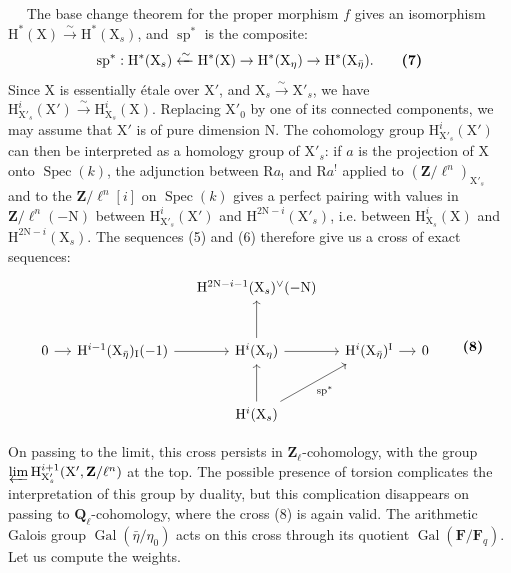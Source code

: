 \documentclass[11pt,leqno]{article}
\newcommand{\Page}[1]{\ifvmode\noindent\else\unskip\ \fi{\footnotesize\textcolor{gray}{[p.\,#1]}}\ \ignorespaces}
\begin{document}
\Page{214}
The base change theorem for the proper morphism \(f\) gives an isomorphism \(\mathrm H^*(\mathrm X)\xrightarrow{\sim}\mathrm H^*(\mathrm X_s)\), and \(\operatorname{sp}^*\) is the composite:
\[
\operatorname{sp}^*:\mathrm H^*(\mathrm X_s)
\xleftarrow{\sim}\mathrm H^*(\mathrm X)
\to\mathrm H^*(\mathrm X_\eta)
\to\mathrm H^*(\mathrm X_{\bar\eta}).
\tag*{\textbf{(7)}}
\]
Since \(\mathrm X\) is essentially étale over \(\mathrm X'\), and \(\mathrm X_s\xrightarrow{\sim}\mathrm X'_s\), we have \(\mathrm H^i_{\mathrm X'_s}(\mathrm X')\xrightarrow{\sim}\mathrm H^i_{\mathrm X_s}(\mathrm X)\). Replacing \(\mathrm X'_0\) by one of its connected components, we may assume that \(\mathrm X'\) is of pure dimension \(\mathrm N\). The cohomology group \(\mathrm H^i_{\mathrm X'_s}(\mathrm X')\) can then be interpreted as a homology group of \(\mathrm X'_s\): if \(a\) is the projection of \(\mathrm X\) onto \(\operatorname{Spec}(k)\), the adjunction between \(\mathrm R a_!\) and \(\mathrm R a^!\) applied to \((\mathbf Z/\ell^n)_{\mathrm X'_s}\) and to the \(\mathbf Z/\ell^n[i]\) on \(\operatorname{Spec}(k)\) gives a perfect pairing with values in \(\mathbf Z/\ell^n(-\mathrm N)\) between \(\mathrm H^i_{\mathrm X'_s}(\mathrm X')\) and \(\mathrm H^{2\mathrm N-i}(\mathrm X'_s)\), i.e. between \(\mathrm H^i_{\mathrm X_s}(\mathrm X)\) and \(\mathrm H^{2\mathrm N-i}(\mathrm X_s)\). The sequences (5) and (6) therefore give us a cross of exact sequences:
\[
\begin{tikzcd}[column sep=small,row sep=large]
& & \mathrm H^{2\mathrm N-i-1}(\mathrm X_s)^{\vee}(-\mathrm N) & & \\
0 \arrow[r] &
\mathrm H^{i-1}(\mathrm X_{\bar\eta})_{\mathrm I}(-1) \arrow[r] &
\mathrm H^i(\mathrm X_\eta) \arrow[r] \arrow[u] &
\mathrm H^i(\mathrm X_{\bar\eta})^{\mathrm I} \arrow[r] & 0 \\
& & \mathrm H^i(\mathrm X_s) \arrow[u] \arrow[ur,"\operatorname{sp}^*"'] & &
\end{tikzcd}
\tag*{\textbf{(8)}}
\]

On passing to the limit, this cross persists in \(\mathbf Z_\ell\)-cohomology, with the group \(\varprojlim\mathrm H^{i+1}_{\mathrm X'_s}(\mathrm X',\mathbf Z/\ell^n)\) at the top. The possible presence of torsion complicates the interpretation of this group by duality, but this complication disappears on passing to \(\mathbf Q_\ell\)-cohomology, where the cross (8) is again valid. The arithmetic Galois group \(\operatorname{Gal}(\bar\eta/\eta_0)\) acts on this cross through its quotient \(\operatorname{Gal}(\mathbf F/\mathbf F_q)\). Let us compute the weights.
\end{document}
